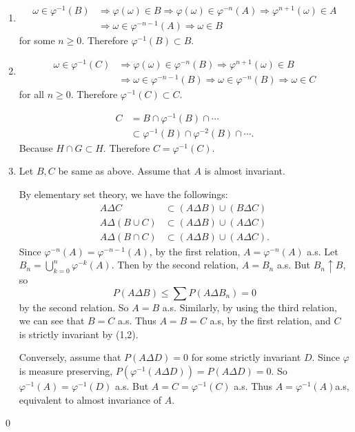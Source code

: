 \begin{problem}[6.1.2] \hfill

	\begin{enumerate}
		\item 
			\[
				\begin{split}
					\omega \in \varphi^{-1}(B)
					&\Rightarrow \varphi(\omega) \in B
					\Rightarrow \varphi(\omega) \in \varphi^{-n}(A)
					\Rightarrow \varphi^{n+1}(\omega) \in A \\
					&\Rightarrow \omega \in \varphi^{-n-1}(A)
					\Rightarrow \omega \in B
				\end{split}
			\]
			for some $n \ge 0$.
			Therefore $\varphi^{-1}(B) \subset B$.

		\item
			\[
\begin{split}
	\omega \in \varphi^{-1}(C) &\Rightarrow \varphi(\omega) \in \varphi^{-n}(B)
	\Rightarrow \varphi^{n+1}(\omega) \in B \\
	&\Rightarrow \omega \in \varphi^{-n-1}(B) \Rightarrow \omega \in \varphi^{-n}(B)
\Rightarrow \omega \in C
\end{split}
	\]
	for all $n \ge 0$.
	Therefore $\varphi^{-1}(C) \subset C$.

	\[
		\begin{split}
			C &= B \cap \varphi^{-1}(B) \cap \cdots \\
			& \subset \varphi^{-1}(B) \cap \varphi^{-2}(B) \cap \cdots .
		\end{split}
	\]
	Because $H\cap G \subset H$.
	Therefore $C = \varphi^{-1}(C)$.

\item Let $B, C$ be same as above.
	Assume that $A$ is almost invariant.

	By elementary set theory, we have the followings:
	\[
		\begin{split}
			A \Delta C & \subset (A \Delta B) \cup (B \Delta C) \\
			A \Delta (B\cup  C) & \subset (A \Delta B) \cup (A \Delta C)\\
			A \Delta (B\cap  C) & \subset (A \Delta B) \cup (A \Delta C).
		\end{split}
	\]
	Since $\varphi^{-n}(A) = \varphi^{-n-1}(A)$, by the first relation, $A = \varphi^{-n}(A)$ a.s.
	Let $B_n = \bigcup_{k = 0}^n \varphi^{-k}(A)$.
	Then by the second relation, $A = B_n$ a.s.
	But $B_n \uparrow B$, so
	\[
		P(A\Delta B) \le \sum P(A\Delta B_n) = 0
	\]
	by the second relation.
	So $A = B$ a.s.
	Similarly, by using the third relation, we can see that $B = C$ a.s.
	Thus $A = B = C$ a.s, by the first relation, and $C$ is strictly invariant by (1,2).
	

	Conversely, assume that $P(A \Delta D) = 0$ for some strictly invariant $D$.
	Since $\varphi$ is measure preserving, $P(\varphi^{-1}(A \Delta D)) = P(A \Delta D) = 0$.
	So $\varphi^{-1}(A) = \varphi^{-1}(D)$ a.s.
	But $A = C = \varphi^{-1}(C)$ a.s.
	Thus $A = \varphi^{-1}(A)$a.s, equivalent to almost invariance of $A$.

	\end{enumerate}

	\qed
\end{problem}

